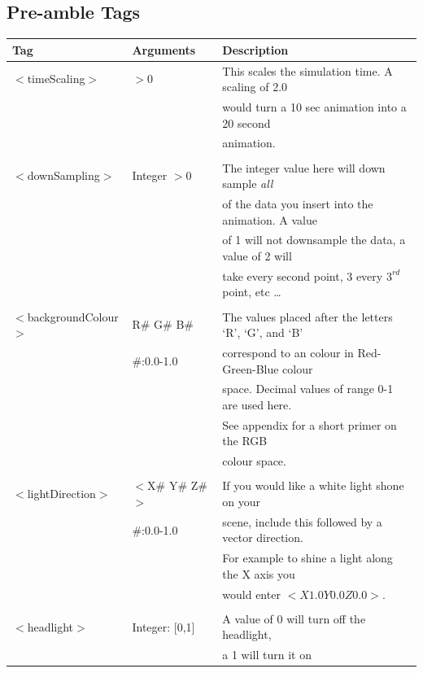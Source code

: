 \documentclass[singlecolumn,12pt]{article}
\begin{document}
\subsection{Pre-amble Tags}
\begin{tabular}{l l l}
\hline Tag & Arguments  & Description \\
\hline $<$timeScaling$>$  & $>0$ & This scales the simulation time. A scaling of 2.0\\
                        &      &  would turn a 10 sec animation into a 20 second \\
                        &       & animation.\\
                        & & \\
$<$downSampling$>$    & Integer $>0$ & The integer value here will down sample \textit{all}\\
            &                      & of the data you insert into the animation. A value \\
            &                      & of 1 will not downsample the data, a value of 2 will \\
            &                      & take every second point, 3 every $3^{rd}$ point, etc \ldots \\
            & & \\
$<$backgroundColour$>$ & R\# G\# B\#  & The values placed after the letters `R', `G', and `B'\\
            &  \#:0.0-1.0           & correspond to an colour in Red-Green-Blue colour \\
            &                       & space. Decimal values of range 0-1 are used here. \\
            &                       & See appendix for a short primer on the RGB\\
            &                       &  colour space.\\
            & & \\
$<$lightDirection$>$ & $<$X\# Y\# Z\#$>$ & If you would like a white light shone on your \\
                   &   \#:0.0-1.0   &  scene, include this followed by a vector direction.\\
                   &                & For example to shine a light along the X axis you \\
                   &                & would enter $<X1.0 Y0.0 Z0.0>$. \\
                   & & \\
$<$headlight$>$ & Integer: [0,1]      & A value of 0 will turn off the headlight,\\
                &                   &  a 1 will turn it on \\
\end{tabular}
\end{document}
